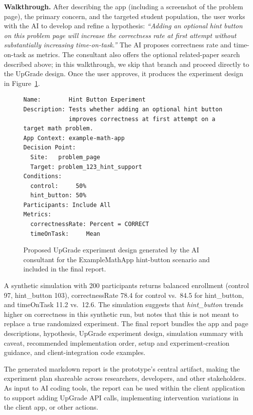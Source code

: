 \documentclass[manuscript,screen]{acmart}
\begin{document}
\textbf{Walkthrough.} After describing the app (including a screenshot of the problem page), the primary concern, and the targeted student population, the user works with the AI to develop and refine a hypothesis: \emph{``Adding an optional hint button on this problem page will increase the correctness rate at first attempt without substantially increasing time-on-task.''} The AI proposes correctness rate and time-on-task as metrics. The consultant also offers the optional related-paper search described above; in this walkthrough, we skip that branch and proceed directly to the UpGrade design. Once the user approves, it produces the experiment design in Figure~\ref{fig:design}.

\begin{figure}[t]
\begin{verbatim}
Name:        Hint Button Experiment
Description: Tests whether adding an optional hint button
             improves correctness at first attempt on a target math problem.
App Context: example-math-app
Decision Point:
  Site:   problem_page
  Target: problem_123_hint_support
Conditions:
  control:     50%
  hint_button: 50%
Participants: Include All
Metrics:
  correctnessRate: Percent = CORRECT
  timeOnTask:     Mean
\end{verbatim}
\caption{Proposed UpGrade experiment design generated by the AI consultant for the ExampleMathApp hint-button scenario and included in the final report.}
\label{fig:design}
\end{figure}

A synthetic simulation with 200 participants returns balanced enrollment (control 97, hint\_button 103), correctnessRate 78.4 for control vs.\ 84.5 for hint\_button, and timeOnTask 11.2 vs.\ 12.6. The simulation suggests that \emph{hint\_button} trends higher on correctness in this synthetic run, but notes that this is not meant to replace a true randomized experiment. The final report bundles the app and page descriptions, hypothesis, UpGrade experiment design, simulation summary with caveat, recommended implementation order, setup and experiment-creation guidance, and client-integration code examples.

The generated markdown report is the prototype's central artifact, making the experiment plan shareable across researchers, developers, and other stakeholders. As input to AI coding tools, the report can be used within the client application to support adding UpGrade API calls, implementing intervention variations in the client app, or other actions.
\end{document}

